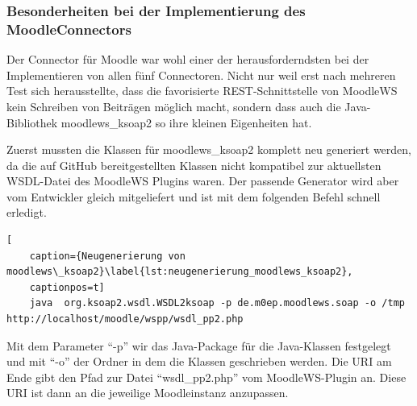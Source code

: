 
\subsubsection{Besonderheiten bei der Implementierung des MoodleConnectors} %
\label{ssub:herausforderungen_bei_der_implementierung_des_moodleconnectors}

Der Connector für Moodle war wohl einer der herausforderndsten bei der Implementieren von allen fünf Connectoren. Nicht nur weil erst nach mehreren Test sich herausstellte, dass die favorisierte REST-Schnittstelle von MoodleWS kein Schreiben von Beiträgen möglich macht, sondern dass auch die Java-Bibliothek moodlews\_ksoap2 so ihre kleinen Eigenheiten hat. 

Zuerst mussten die Klassen für moodlews\_ksoap2 komplett neu generiert werden, da die auf GitHub bereitgestellten Klassen nicht kompatibel zur aktuellsten WSDL-Datei des MoodleWS Plugins waren. Der passende Generator wird aber vom Entwickler gleich mitgeliefert und ist mit dem folgenden Befehl schnell erledigt.

\begin{lstlisting}[
    caption={Neugenerierung von moodlews\_ksoap2}\label{lst:neugenerierung_moodlews_ksoap2},
    captionpos=t]
    java  org.ksoap2.wsdl.WSDL2ksoap -p de.m0ep.moodlews.soap -o /tmp http://localhost/moodle/wspp/wsdl_pp2.php
\end{lstlisting}

Mit dem Parameter \enquote{-p} wir das Java-Package für die Java-Klassen festgelegt und mit \enquote{-o} der Ordner in dem die Klassen geschrieben werden. Die URI am Ende gibt den Pfad zur Datei \enquote{wsdl\_pp2.php} vom MoodleWS-Plugin an. Diese URI ist dann an die jeweilige Moodleinstanz anzupassen.

